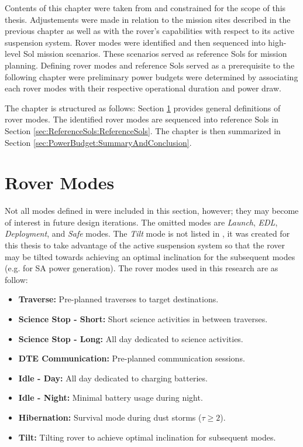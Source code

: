 Contents of this chapter were taken from  and constrained for the scope of this thesis. Adjustements were made in relation to the mission sites described in the previous chapter as well as with the rover's capabilities with respect to its active suspension system. Rover modes were identified and then sequenced into high-level Sol mission scenarios. These scenarios served as reference Sols for mission planning. Defining rover modes and reference Sols served as a prerequisite to the following chapter were preliminary power budgets were determined by associating each rover modes with their respective operational duration and power draw.

The chapter is structured as follows: Section \ref{sec:ReferenceSols:RoverModes} provides general definitions of rover modes. The identified rover modes are sequenced into reference Sols in Section \ref{sec:ReferenceSols:ReferenceSols}. The chapter is then summarized in Section \ref{sec:PowerBudget:SummaryAndConclusion}.

\section{Rover Modes}
\label{sec:ReferenceSols:RoverModes}
Not all modes defined in  were included in this section, however; they may become of interest in future design iterations. The omitted modes are \textit{Launch}, \textit{\ac{EDL}}, \textit{Deployment}, and \textit{Safe} modes. The \textit{Tilt} mode is not listed in , it was created for this thesis to take advantage of the active suspension system so that the rover may be tilted towards achieving an optimal inclination for the subsequent modes (e.g. for \ac{SA} power generation). The rover modes used in this research are as follow:

\begin{itemize}
    \item \textbf{Traverse:} Pre-planned traverses to target destinations.
    \item \textbf{Science Stop - Short:} Short science activities in between traverses.
    \item \textbf{Science Stop - Long:} All day dedicated to science activities.
    \item \textbf{\ac{DTE} Communication:} Pre-planned communication sessions.
    \item \textbf{Idle - Day:} All day dedicated to charging batteries.
    \item \textbf{Idle - Night:} Minimal battery usage during night.
    \item \textbf{Hibernation:} Survival mode during dust storms ($\tau \geq 2$).
    \item \textbf{Tilt:} Tilting rover to achieve optimal inclination for subsequent modes.
\end{itemize}

